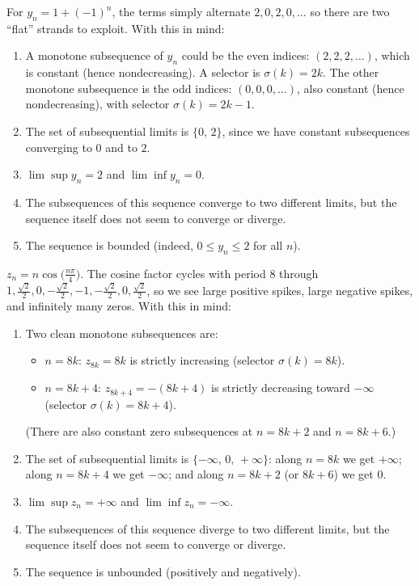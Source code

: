 \documentclass[12pt]{article}
\begin{document}
For \textbf{$y_n = 1 + (-1)^n$}, the terms simply alternate $2, 0, 2, 0, \dots$ so there are two “flat” strands to exploit. With this in mind:
\begin{enumerate}[label=(\alph*)]
    \item A monotone subsequence of $y_n$ could be the even indices: $(2,2,2,\dots)$, which is constant (hence nondecreasing). A selector is $\sigma(k)=2k$.  
    The other monotone subsequence is the odd indices: $(0,0,0,\dots)$, also constant (hence nondecreasing), with selector $\sigma(k)=2k-1$.
    \item The set of subsequential limits is $\{0,\,2\}$, since we have constant subsequences converging to $0$ and to $2$.
    \item $\lim\sup y_n = 2$ and $\lim\inf y_n = 0$.
    \item The subsequences of this sequence converge to two different limits, but the sequence itself does not seem to converge or diverge.
    \item The sequence is bounded (indeed, $0 \le y_n \le 2$ for all $n$).
\end{enumerate}

\textbf{$z_n = n \cos\!\big(\tfrac{n\pi}{4}\big)$}. The cosine factor cycles with period $8$ through $1, \tfrac{\sqrt2}{2}, 0, -\tfrac{\sqrt2}{2}, -1, -\tfrac{\sqrt2}{2}, 0, \tfrac{\sqrt2}{2}$, so we see large positive spikes, large negative spikes, and infinitely many zeros. With this in mind:
\begin{enumerate}[label=(\alph*)]
    \item Two clean monotone subsequences are:
    \begin{itemize}
        \item $n=8k$: $z_{8k}=8k$ is strictly increasing (selector $\sigma(k)=8k$).
        \item $n=8k+4$: $z_{8k+4}=-(8k+4)$ is strictly decreasing toward $-\infty$ (selector $\sigma(k)=8k+4$).
    \end{itemize}
    (There are also constant zero subsequences at $n=8k+2$ and $n=8k+6$.)
    \item The set of subsequential limits is $\{-\infty,\,0,\,+\infty\}$: along $n=8k$ we get $+\infty$; along $n=8k+4$ we get $-\infty$; and along $n=8k+2$ (or $8k+6$) we get $0$.
    \item $\lim\sup z_n = +\infty$ and $\lim\inf z_n = -\infty$.
    \item The subsequences of this sequence diverge to two different limits, but the sequence itself does not seem to converge or diverge.
    \item The sequence is unbounded (positively and negatively).
\end{enumerate}
\end{document}
